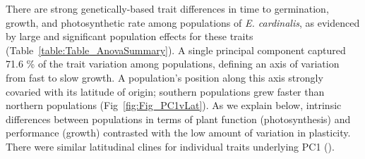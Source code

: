 \documentclass[11pt, oneside]{article}
\begin{document}
There are strong genetically-based trait differences in time to germination, growth, and photosynthetic rate among populations of \textit{E. cardinalis}, as evidenced by large and significant population effects for these traits (Table~\ref{table:Table_AnovaSummary}). A single principal component captured 71.6 \% of the trait variation among populations, defining an axis of variation from fast to slow growth. A population's position along this axis strongly covaried with its latitude of origin; southern populations grew faster than northern populations (Fig~\ref{fig:Fig_PC1vLat}). As we explain below, intrinsic differences between populations in terms of plant function (photosynthesis) and performance (growth) contrasted with the low amount of variation in plasticity. There were similar latitudinal clines for individual traits underlying PC1 ().

\end{document}
